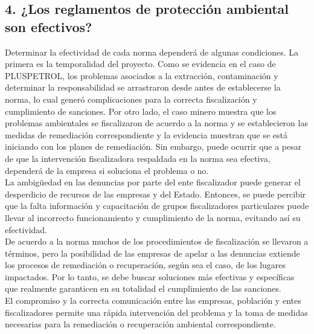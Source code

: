 \documentclass[12pt, a4paper]{article} %
\begin{document}
\begin{multicols}{2}
        \section*{4. ¿Los reglamentos de protección ambiental son efectivos?}
        Determinar la efectividad de cada norma dependerá de algunas condiciones. La primera es la temporalidad del proyecto. Como se evidencia en el caso de PLUSPETROL, los problemas asociados a la extracción, contaminación y determinar la responsabilidad se arrastraron desde antes de establecerse la norma, lo cual generó complicaciones para la correcta fiscalización y cumplimiento de sanciones. Por otro lado, el caso minero muestra que los problemas ambientales se fiscalizaron de acuerdo a la norma y se establecieron las medidas de remediación correspondiente y la evidencia muestran que se está iniciando con los planes de remediación. Sin embargo, puede ocurrir que a pesar de que la intervención fiscalizadora respaldada en la norma sea efectiva, dependerá de la empresa si soluciona el problema o no. \\La ambigüedad en las denuncias por parte del ente fiscalizador puede generar el desperdicio de recursos de las empresas y del Estado. Entonces, se puede percibir que la falta información y capacitación de grupos fiscalizadores particulares puede llevar al incorrecto funcionamiento y cumplimiento de la norma, evitando así su efectividad. \\De acuerdo a la norma muchos de los procedimientos de fiscalización se llevaron a términos, pero la posibilidad de las empresas de apelar a las denuncias extiende los procesos de remediación o recuperación, según sea el caso, de los lugares impactados. Por lo tanto, se debe buscar soluciones más efectivas y específicas que realmente garanticen en su totalidad el cumplimiento de las sanciones. \\El compromiso y la correcta comunicación entre las empresas, población y entes fiscalizadores permite una rápida intervención del problema y la toma de medidas necesarias para la remediación o recuperación ambiental correspondiente. 
        

\end{multicols}
\end{document}
